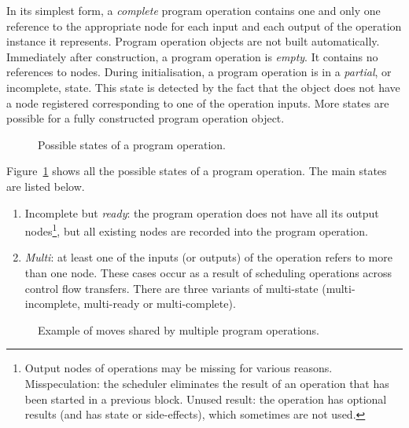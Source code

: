 \documentclass[a4paper,twoside]{tce}
\begin{document}
In its simplest form,
%
%
a \emph{complete} program operation contains one and only one reference to
the appropriate node for each input and each output of the operation
instance it represents.
%
Program operation objects are not built automatically. Immediately after
construction, a program operation is \emph{empty}. It contains no references
to nodes. During initialisation, a program operation is in a \emph{partial},
or incomplete, state. This state is detected by the fact that the object
does not have a node registered corresponding to one of the operation
inputs.
%
More states are possible for a fully constructed program operation object.
%
\begin{figure}[tb]
  \centerline{}
  \caption{Possible states of a program operation.}
  \label{fig:program-operation-states}
\end{figure}
%
Figure~\ref{fig:program-operation-states} shows all the possible states of a
program operation. The main states are listed below.
\begin{enumerate}
\item %
  Incomplete but \emph{ready}: the program operation does not have all its
  output nodes\footnote{
%
    Output nodes of operations may be missing for various reasons.
    Misspeculation: the scheduler eliminates the result of an operation that
    has been started in a previous block. Unused result: the operation has
    optional results (and has state or side-effects), which sometimes are
    not used.},
%
  but all existing nodes are recorded into the program operation.
\item %
  \emph{Multi}: at least one of the inputs (or outputs) of the operation
  refers to more than one node. These cases occur as a result of scheduling
  operations across control flow transfers. There are three variants of
  multi-state (multi-incomplete, multi-ready or multi-complete).
\end{enumerate}

\begin{figure}[tb]
\centerline{}
\caption{Example of moves shared by multiple program operations.}
  \label{fig:shared-prog-op}
\end{figure}
\end{document}
